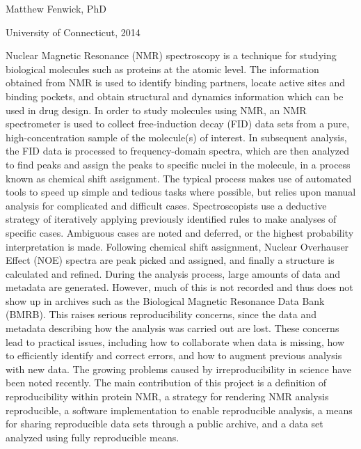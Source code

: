 \pagestyle{myabstract} %
\thispagestyle{empty} %

\begin{center}
  {\LARGE \mattftitle{}}
  
  \vspace{2cm}

  Matthew Fenwick, PhD
  
  \vspace{0.5cm}

  University of Connecticut, 2014
  
  \vspace{1in}
\end{center}

\thispagestyle{empty}
Nuclear Magnetic Resonance (NMR) spectroscopy is a technique for studying 
biological molecules such as proteins at the atomic level.  
The information obtained from NMR is used to identify 
binding partners, locate active sites and binding pockets, and obtain 
structural and dynamics information which can be used in drug design.  In 
order to study molecules using NMR, an NMR spectrometer is used to collect 
free-induction decay (FID) data sets from a pure, high-concentration sample 
of the molecule(s) of interest.  In subsequent analysis, the FID data is 
processed to frequency-domain spectra, which are then analyzed to find peaks 
and assign the peaks to specific nuclei in the molecule, in a process known as 
chemical shift assignment.  The typical process makes use of automated tools to 
speed up simple and tedious tasks where possible, but relies upon manual 
analysis for complicated and difficult cases.  Spectroscopists use a deductive 
strategy of iteratively applying previously identified rules to make analyses 
of specific cases.  Ambiguous cases are noted and deferred, or the highest 
probability interpretation is made.  Following chemical shift assignment, 
Nuclear Overhauser Effect (NOE) spectra are peak picked and assigned, and 
finally a structure is calculated and refined.  
During the analysis process, large amounts of data and metadata are generated.  
However, much of this is not recorded and thus does not show up in archives 
such as the Biological Magnetic Resonance Data Bank (BMRB).
This raises serious 
reproducibility concerns, since the data and metadata describing how the 
analysis was carried out are lost.  These concerns lead to practical issues,
including how to collaborate when data is missing, how to efficiently identify 
and correct errors, and how to augment previous analysis with new data.
The growing problems caused by irreproducibility in science have been noted 
recently.  The main contribution of this project is a definition of 
reproducibility within protein NMR, a strategy for rendering NMR analysis 
reproducible, a software implementation to enable reproducible analysis, a 
means for sharing reproducible data sets through a public archive, and a data 
set analyzed using fully reproducible means.

\clearpage
\pagestyle{plain}

